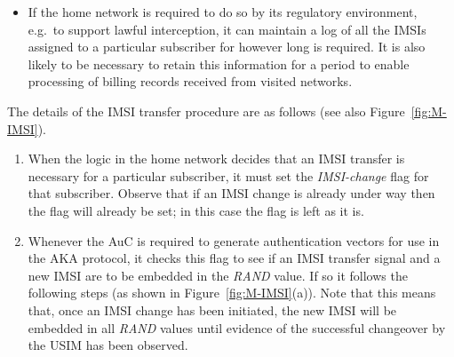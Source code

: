 \documentclass{acm_proc_article-sp}
\begin{document}
\begin{itemize}
\begin{itemize}
\end{itemize}

\item If the home network is required to do so by its regulatory environment, e.g.\ to support lawful interception, it can maintain a log of all the IMSIs assigned to a particular subscriber for however long is required. It is also likely to be necessary to retain this information for a period to enable processing of billing records received from visited networks.

\end{itemize}
 
 
The details of the IMSI transfer procedure are as follows (see also Figure~\ref{fig:M-IMSI}).

\begin{enumerate}
  
\item When the logic in the home network decides that an IMSI transfer is necessary for a particular subscriber, it must set the \emph{IMSI-change} flag for that subscriber. Observe that if an IMSI change is already under way then the flag will already be set; in this case the flag is left as it is.

\item Whenever the AuC is required to generate authentication vectors for use in the AKA protocol, it checks this flag to see if an IMSI transfer signal and a new IMSI are to be embedded in the \emph{RAND} value. If so it follows the following steps (as shown in Figure~\ref{fig:M-IMSI}(a)). Note that this means that, once an IMSI change has been initiated, the new IMSI will be embedded in all \emph{RAND} values until evidence of the successful changeover by the USIM has been observed.


\end{enumerate}
\end{document}
